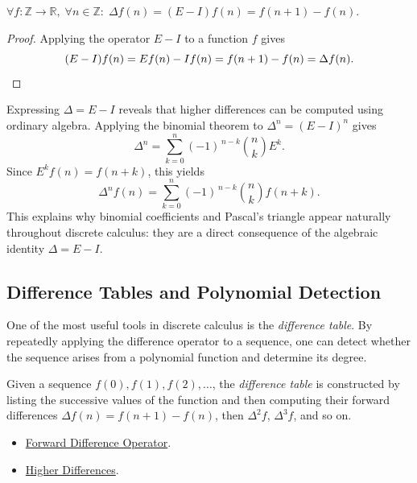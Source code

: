 \begin{remark*}
\(\forall f : \mathbb{Z}\to\mathbb{R},\; \forall n \in \mathbb{Z}:\;
\Delta f(n) = (E-I)f(n) = f(n+1) - f(n)\).
\end{remark*}

\begin{proof}
Applying the operator \(E-I\) to a function \(f\) gives
\[
(E-I)f(n) = Ef(n) - If(n) = f(n+1) - f(n) = \Delta f(n). \qedhere
\]
\end{proof}

\begin{remark*}
Expressing \(\Delta = E - I\) reveals that higher differences can be
computed using ordinary algebra. Applying the binomial theorem to
\(\Delta^n = (E-I)^n\) gives
\[
\Delta^n
=
\sum_{k=0}^{n}
(-1)^{\,n-k}
\binom{n}{k}
E^{k}.
\]
Since \(E^k f(n) = f(n+k)\), this yields
\[
\Delta^n f(n)
=
\sum_{k=0}^{n}
(-1)^{\,n-k}
\binom{n}{k}
f(n+k).
\]
This explains why binomial coefficients and Pascal's triangle appear
naturally throughout discrete calculus: they are a direct consequence
of the algebraic identity \(\Delta = E - I\).
\end{remark*}

\subsection{Difference Tables and Polynomial Detection}
\label{subsec:difference-tables}

One of the most useful tools in discrete calculus is the \emph{difference
table}. By repeatedly applying the difference operator to a sequence,
one can detect whether the sequence arises from a polynomial function and
determine its degree.

\begin{definition}
\label{def:difference-table}
Given a sequence \(f(0), f(1), f(2), \dots\), the \emph{difference table}
is constructed by listing the successive values of the function and then
computing their forward differences \(\Delta f(n) = f(n+1)-f(n)\),
then \(\Delta^2 f\), \(\Delta^3 f\), and so on.
\end{definition}

\begin{dependencies}
\begin{itemize}
  \item \hyperref[def:forward-difference]{Forward Difference Operator}.
  \item \hyperref[def:higher-differences]{Higher Differences}.
\end{itemize}
\end{dependencies}

